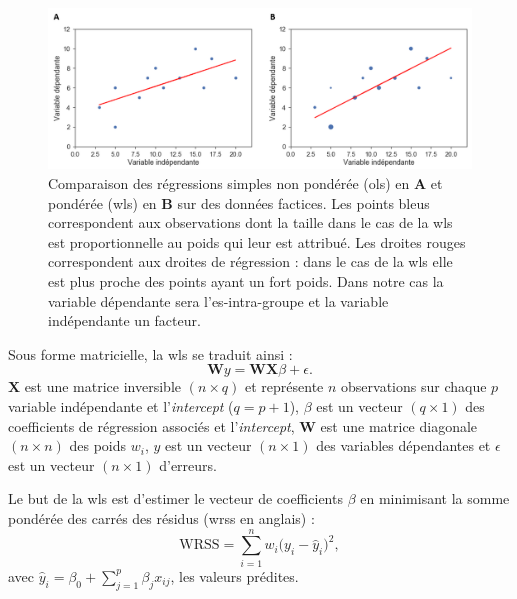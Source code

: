 \begin{figure}[h!]
  \centering
	\includegraphics[width=1.0\linewidth]{figures/chapter-3/factors-comparison-ols-wls} 
  \caption[Comparaison des régressions simples non pondérée (\gls{ols}) et pondérée (\gls{wls}) sur des données factices.]{Comparaison des régressions 
	simples non pondérée (\gls{ols}) en \textbf{A} et pondérée (\gls{wls}) en \textbf{B} sur des données factices. Les points bleus correspondent aux observations
	dont la taille dans le cas de la \gls{wls} est proportionnelle au poids qui leur est attribué. Les droites rouges correspondent aux droites de régression : dans le cas de la \gls{wls} elle
	est plus proche des points ayant un fort poids. Dans notre cas la variable dépendante sera l'\gls{es}-intra-groupe et la variable indépendante un facteur.}
  \label{Figure:factors_comparison_ols_wls}
\end{figure}

Sous forme matricielle, la \gls{wls} se traduit ainsi : 
\begin{equation}
\label{eq:factors_model_WLS}
\textbf{W}y = \textbf{WX}\beta + \epsilon.
\end{equation}
$\textbf{X}$ est une matrice inversible $(n \times q)$ et représente $n$ observations sur chaque $p$ variable indépendante et l'\textit{intercept}  
($q = p + 1$), 
$\beta$ est un vecteur $(q \times 1)$ des coefficients de régression associés et l'\textit{intercept}, $\textbf{W}$ est une matrice diagonale $(n \times n)$  
des poids $w_{i}$, $y$ est un vecteur $(n \times 1)$ des variables dépendantes et $\epsilon$ est un vecteur $(n \times 1)$ d'erreurs.

Le but de la \gls{wls} est d'estimer le vecteur de coefficients $\beta$ en minimisant la somme pondérée des carrés des résidus (\gls{wrss} en anglais) :
\begin{equation}
\label{eq:factors_WRSS}
\text{WRSS} = \sum_{i=1}^{n} w_i \Big(y_i - \hat{y}_i\Big)^2, 
\end{equation}
avec $\hat{y}_i = \beta_{0} + \sum_{j=1}^{p}\beta_{j}x_{ij}$, les valeurs prédites.

